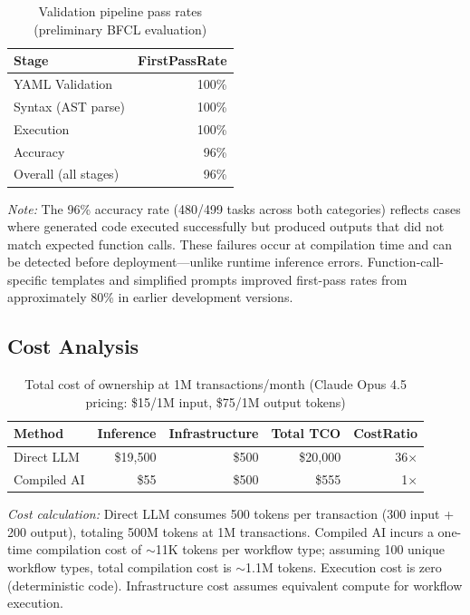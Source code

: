 \documentclass[11pt]{article}
\begin{document}
\begin{table}[ht]
\centering
\caption{Validation pipeline pass rates (preliminary BFCL evaluation)}
\label{tab:validation-results}
\begin{tabular}{lr}
\toprule
Stage & FirstPassRate \\
\midrule
YAML Validation & 100\% \\
Syntax (AST parse) & 100\% \\
Execution & 100\% \\
Accuracy & 96\% \\
\midrule
Overall (all stages) & 96\% \\
\bottomrule
\end{tabular}
\end{table}

\noindent\textit{Note:} The 96\% accuracy rate (480/499 tasks across both categories) reflects cases where generated code executed successfully but produced outputs that did not match expected function calls. These failures occur at compilation time and can be detected before deployment—unlike runtime inference errors. Function-call-specific templates and simplified prompts improved first-pass rates from approximately 80\% in earlier development versions.

\subsection{Cost Analysis}

\begin{table}[ht]
\centering
\caption{Total cost of ownership at 1M transactions/month (Claude Opus 4.5 pricing: \$15/1M input, \$75/1M output tokens)}
\label{tab:cost-results}
\begin{tabular}{lrrrr}
\toprule
Method & Inference & Infrastructure & Total TCO & CostRatio \\
\midrule
Direct LLM & \$19,500 & \$500 & \$20,000 & 36$\times$ \\
Compiled AI & \$55 & \$500 & \$555 & 1$\times$ \\
\bottomrule
\end{tabular}
\end{table}

\noindent\textit{Cost calculation:} Direct LLM consumes 500 tokens per transaction (300 input + 200 output), totaling 500M tokens at 1M transactions. Compiled AI incurs a one-time compilation cost of $\sim$11K tokens per workflow type; assuming 100 unique workflow types, total compilation cost is $\sim$1.1M tokens. Execution cost is zero (deterministic code). Infrastructure cost assumes equivalent compute for workflow execution.
\end{document}
